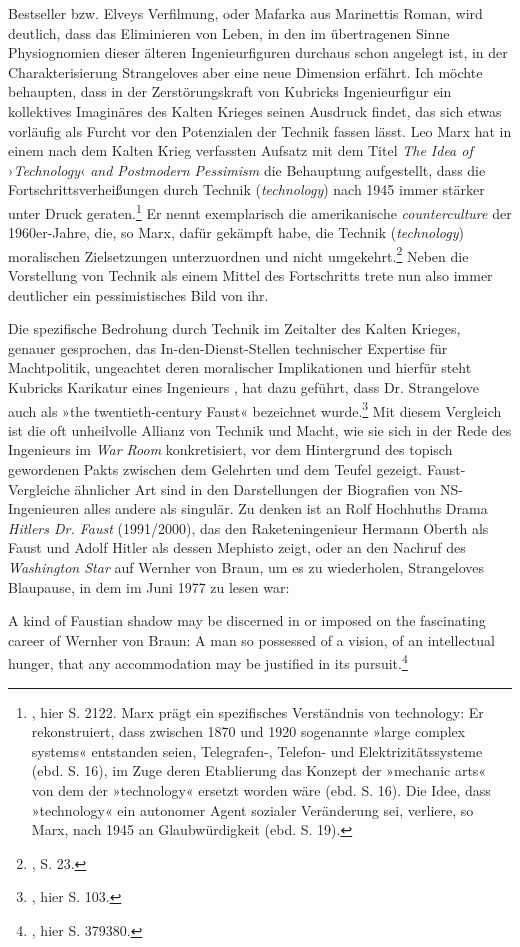 \documentclass[%
	fontsize=10pt,%
	twoside,%
	headings=optiontoheadandtoc,%
	showtrims]{scrbook}
\renewenvironment{quote}{%
  \addmargin[\genericindent]{0pt}%
  \KOMAoptions{parskip=true}%
  \ifdim\parskip>0pt\else\addvspace{\intextsep}\fi
}{%
  \par
  \endaddmargin\vspace{\intextsep}
}
\renewcommand{\texttt}{\nohyphens} %
\begin{document}
Bestseller bzw. Elveys Verfilmung, oder Mafarka aus \texttt{Marinettis} Roman, wird deutlich, dass das Eliminieren von Leben, in den \textendash{} im übertragenen Sinne \textendash{} Physiognomien dieser älteren Ingenieurfiguren durchaus schon angelegt ist, in der \texttt{Charakterisierung} \texttt{Strangeloves} aber eine neue Dimension erfährt. Ich möchte behaupten, dass in der Zerstörungskraft von Kubricks Ingenieur\-figur ein kollektives Imaginäres des Kalten Krieges seinen Ausdruck findet, das sich etwas vorläufig als Furcht vor den Potenzialen der Technik fassen lässt. Leo Marx hat in einem nach dem Kalten Krieg verfassten Aufsatz mit dem Titel \emph{The Idea of} ›\emph{Technology}‹ \emph{and Postmodern Pessimism} die Behauptung aufgestellt, dass die Fortschrittsverheißungen durch Technik (\emph{technology}) nach 1945 immer stärker unter Druck geraten.\footnote{\cite[][]{marx1994a}, hier S. 21\textendash{}22. Marx prägt ein spezifisches Verständnis von technology: Er rekonstruiert, dass zwischen 1870 und 1920 sogenannte »large complex systems« entstanden seien, Telegrafen-, Telefon- und Elektrizitätssysteme (ebd. S. 16), im Zuge deren Etablierung das Konzept der »mechanic arts« von dem der »technology« ersetzt worden wäre (ebd. S. 16). Die Idee, dass »technology« ein autonomer Agent sozialer Veränderung sei, verliere, so Marx, nach 1945 an Glaubwürdigkeit (ebd. S. 19).}  Er nennt exemplarisch die amerikanische \emph{counterculture} der 1960er-Jahre, die, so Marx, dafür gekämpft habe, die Technik (\emph{technology}) moralischen Zielsetzungen unterzuordnen und nicht umgekehrt.\footnote{\cite[][]{marx1994a}, S. 23.}  Neben die Vorstellung von Technik als einem Mittel des Fortschritts trete nun also immer deutlicher ein pessimistisches Bild von ihr.\par Die spezifische Bedrohung durch Technik im Zeitalter des Kalten Krieges, genauer gesprochen, das In-den-Dienst-Stellen technischer Expertise für Machtpolitik, ungeachtet deren moralischer Implikationen \textendash{} und hierfür steht Kubricks Karikatur eines Ingenieurs \textendash{}, hat dazu geführt, dass Dr. Strangelove auch als »the twentieth-century Faust« bezeichnet wurde.\footnote{\cite[][]{smith2008a}, hier S. 103.}  Mit diesem Vergleich ist die oft unheilvolle Allianz von Technik und Macht, wie sie sich in der Rede des Ingenieurs im \emph{War Room} konkretisiert, vor dem Hintergrund des topisch gewordenen Pakts zwischen dem Gelehrten und dem Teufel gezeigt. Faust-Vergleiche ähnlicher Art sind in den Darstellungen der Biografien von NS-Ingenieuren alles andere als singulär. Zu denken ist an Rolf Hochhuths Drama \emph{Hitlers Dr. Faust} (1991/2000), das den Raketeningenieur Hermann Oberth als Faust und Adolf Hitler als dessen Mephisto zeigt, oder an den Nachruf des \emph{Washington Star} auf Wernher von Braun, um es zu wiederholen, Strangeloves Blaupause, in dem im Juni 1977 zu lesen war:\begin{quote}
\par A kind of Faustian shadow may be discerned in \textendash{} or imposed on \textendash{} the fascinating career of Wernher von Braun: A man so possessed of a vision, of an intellectual hunger, that any accommodation may be justified in its pursuit.\footnote{\cite[][]{leucht2018a}, hier S. 379\textendash{}380.} 
\end{quote}
\end{document}
